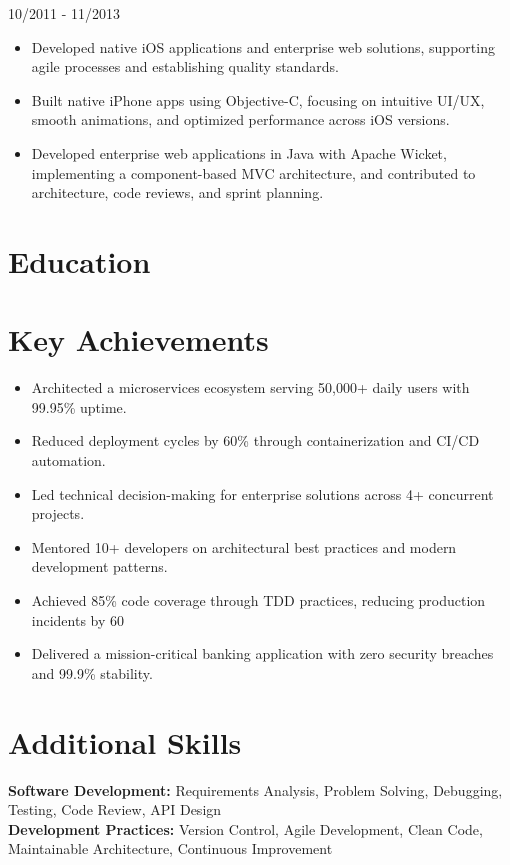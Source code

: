 \documentclass{mycv}
\begin{document}
{10/2011 - 11/2013}

\begin{itemize}
    \item Developed native iOS applications and enterprise web solutions, supporting agile processes and establishing quality
standards.
    \item Built native iPhone apps using Objective-C, focusing on intuitive UI/UX, smooth animations, and optimized performance
across iOS versions.
    \item Developed enterprise web applications in Java with Apache Wicket, implementing a component-based MVC architecture,
and contributed to architecture, code reviews, and sprint planning.
\end{itemize}

\section*{Education}



\section*{Key Achievements}

\begin{itemize}
    \item Architected a microservices ecosystem serving 50,000+ daily users with 99.95\% uptime.
    \item Reduced deployment cycles by 60\% through containerization and CI/CD automation.
    \item Led technical decision-making for enterprise solutions across 4+ concurrent projects.
    \item Mentored 10+ developers on architectural best practices and modern development patterns.
    \item Achieved 85\% code coverage through TDD practices, reducing production incidents by 60%
    \item Delivered a mission-critical banking application with zero security breaches and 99.9\% stability.
\end{itemize}

\section{Additional Skills}

\textbf{Software Development:} Requirements Analysis, Problem Solving,
Debugging, Testing, Code Review, API Design\\
\textbf{Development Practices:} Version Control, Agile Development,
Clean Code, Maintainable Architecture, Continuous Improvement    
\end{document}
